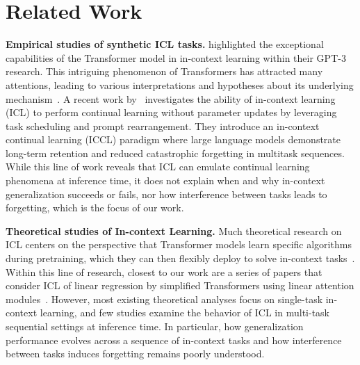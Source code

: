 \documentclass{article}
\theoremstyle{plain}
\theoremstyle{definition}
\theoremstyle{remark}
\begin{document}
\vspace{-0.1in}\section{Related Work}
\noindent \textbf{Empirical studies of synthetic ICL tasks.}
\citet{brown2020language} highlighted the exceptional capabilities of the Transformer model in in-context learning within their GPT-3 research. This intriguing phenomenon of Transformers has attracted many attentions, leading to various interpretations and hypotheses about its underlying mechanism~\cite{wei2022emergent,olsson2022context,schaeffer2023are,chan_data_2022,raventos_pretraining_2023,min-etal-2022-metaicl}. A recent work by~\citet{kang2025incontextlearningperformcontinual} investigates the ability of in-context learning (ICL) to perform continual learning without parameter updates by leveraging task scheduling and prompt rearrangement. They introduce an in-context continual learning (ICCL) paradigm where large language models demonstrate long-term retention and reduced catastrophic forgetting in multitask sequences. While this line of work reveals that ICL can emulate continual learning phenomena at inference time, it does not explain when and why in-context generalization succeeds or fails, nor how interference between tasks leads to forgetting, which is the focus of our work. 

\noindent \textbf{Theoretical studies of In-context Learning.}
Much theoretical research on ICL centers on the perspective that Transformer models learn specific algorithms during pretraining, which they can then flexibly deploy to solve in-context tasks~\cite{xie2022an,bai2023transformers,li2024how,liu2025on,pmlr-v258-chang25b}. Within this line of research, closest to our work are a series of papers that consider ICL of linear regression by simplified Transformers using linear attention modules~\cite{bai2023transformers,ahn2023transformers,pmlr-v202-von-oswald23a,zhang_context_2024,wu_how_2024,duraisamy2024finitesampleanalysisbounds}. However, most existing theoretical analyses focus on single-task in-context learning, and few studies examine the behavior of ICL in multi-task sequential settings at inference time. In particular, how generalization performance evolves across a sequence of in-context tasks and how interference between tasks induces forgetting remains poorly understood. 
\end{document}
